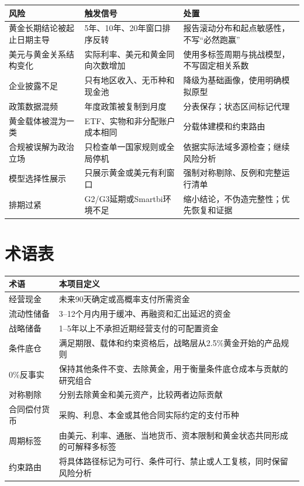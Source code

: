 \documentclass[UTF8,fontset=windows,12pt,openany]{ctexbook}
\begin{document}
\begin{longtable}{p{3.4cm}p{4.5cm}p{5.5cm}}
\toprule
\textbf{风险} & \textbf{触发信号} & \textbf{处置}\\
\midrule
黄金长期结论被起止日期主导 & 5年、10年、20年窗口排序反转 & 报告滚动分布和起点敏感性，不写“必然跑赢”\\
美元与黄金关系结构变化 & 实际利率、美元和黄金同向次数增加 & 使用多标签周期与挑战模型，不写固定相关系数\\
企业披露不足 & 只有地区收入、无币种和现金池 & 降级为基础画像，使用明确模拟原型\\
政策数据混频 & 年度政策被复制到月度 & 分表保存；状态区间标记代理\\
黄金载体被混为一类 & ETF、实物和非分配账户成本相同 & 分载体建模和约束路由\\
合规被误解为政治立场 & 只检查单一国家规则或全局停机 & 依据实际法域多源检查；继续风险分析\\
模型选择性展示 & 只展示黄金或美元有利窗口 & 强制对称剔除、反例和完整运行清单\\
排期过紧 & G2/G3延期或Smartbi环境不足 & 缩小结论，不伪造完整性；优先恢复和证据\\
\bottomrule
\end{longtable}

\chapter{术语表}

\begin{longtable}{p{3.4cm}p{9.6cm}}
\toprule
\textbf{术语} & \textbf{本项目定义}\\
\midrule
经营现金 & 未来90天确定或高概率支付所需资金\\
流动性储备 & 3--12个月内用于缓冲、再融资和汇出延迟的资金\\
战略储备 & 1--5年以上不承担近期经营支付的可配置资金\\
条件底仓 & 满足期限、载体和约束资格后，战略层从2.5\%黄金开始的产品规则\\
0\%反事实 & 保持其他条件不变、去除黄金，用于衡量条件底仓成本与贡献的研究组合\\
对称剔除 & 分别去除黄金和美元资产，比较两者边际贡献\\
合同偿付货币 & 采购、利息、本金或其他合同实际约定的支付币种\\
周期标签 & 由美元、利率、通胀、当地货币、资本限制和黄金状态共同形成的可解释多标签\\
约束路由 & 将具体路径标记为可行、条件可行、禁止或人工复核，同时保留风险分析\\
\bottomrule
\end{longtable}
\end{document}
